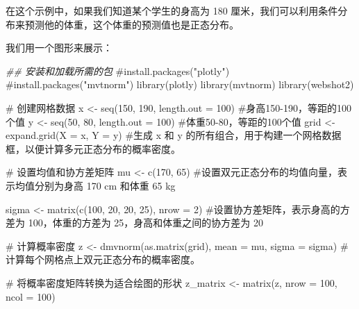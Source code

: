 \documentclass[
  letterpaper,
  DIV=11,
  numbers=noendperiod]{scrartcl}
\newenvironment{Shaded}{\begin{snugshade}}{\end{snugshade}}
\newcommand{\AttributeTok}[1]{\textcolor[rgb]{0.40,0.45,0.13}{#1}}
\newcommand{\CommentTok}[1]{\textcolor[rgb]{0.37,0.37,0.37}{#1}}
\newcommand{\DecValTok}[1]{\textcolor[rgb]{0.68,0.00,0.00}{#1}}
\newcommand{\DocumentationTok}[1]{\textcolor[rgb]{0.37,0.37,0.37}{\textit{#1}}}
\newcommand{\FunctionTok}[1]{\textcolor[rgb]{0.28,0.35,0.67}{#1}}
\newcommand{\NormalTok}[1]{\textcolor[rgb]{0.00,0.23,0.31}{#1}}
\newcommand{\OtherTok}[1]{\textcolor[rgb]{0.00,0.23,0.31}{#1}}
\begin{document}
在这个示例中，如果我们知道某个学生的身高为 180
厘米，我们可以利用条件分布来预测他的体重，这个体重的预测值也是正态分布。

我们用一个图形来展示：

\begin{Shaded}
\begin{Highlighting}[]
\DocumentationTok{\#\# 安装和加载所需的包}
\CommentTok{\#install.packages("plotly")}
\CommentTok{\#install.packages("mvtnorm")}
\FunctionTok{library}\NormalTok{(plotly)}
\FunctionTok{library}\NormalTok{(mvtnorm)}
\FunctionTok{library}\NormalTok{(webshot2)}

\CommentTok{\# 创建网格数据}
\NormalTok{x }\OtherTok{\textless{}{-}} \FunctionTok{seq}\NormalTok{(}\DecValTok{150}\NormalTok{, }\DecValTok{190}\NormalTok{, }\AttributeTok{length.out =} \DecValTok{100}\NormalTok{)}
\CommentTok{\#身高150{-}190，等距的100个值}
\NormalTok{y }\OtherTok{\textless{}{-}} \FunctionTok{seq}\NormalTok{(}\DecValTok{50}\NormalTok{, }\DecValTok{80}\NormalTok{, }\AttributeTok{length.out =} \DecValTok{100}\NormalTok{)}
\CommentTok{\#体重50{-}80，等距的100个值}
\NormalTok{grid }\OtherTok{\textless{}{-}} \FunctionTok{expand.grid}\NormalTok{(}\AttributeTok{X =}\NormalTok{ x, }\AttributeTok{Y =}\NormalTok{ y)}
\CommentTok{\#生成 x 和 y 的所有组合，用于构建一个网格数据框，以便计算多元正态分布的概率密度。}

\CommentTok{\# 设置均值和协方差矩阵}
\NormalTok{mu }\OtherTok{\textless{}{-}} \FunctionTok{c}\NormalTok{(}\DecValTok{170}\NormalTok{, }\DecValTok{65}\NormalTok{)}
\CommentTok{\#设置双元正态分布的均值向量，表示均值分别为身高 170 cm 和体重 65 kg}

\NormalTok{sigma }\OtherTok{\textless{}{-}} \FunctionTok{matrix}\NormalTok{(}\FunctionTok{c}\NormalTok{(}\DecValTok{100}\NormalTok{, }\DecValTok{20}\NormalTok{, }\DecValTok{20}\NormalTok{, }\DecValTok{25}\NormalTok{), }\AttributeTok{nrow =} \DecValTok{2}\NormalTok{)}
\CommentTok{\#设置协方差矩阵，表示身高的方差为 100，体重的方差为 25，身高和体重之间的协方差为 20}

\CommentTok{\# 计算概率密度}
\NormalTok{z }\OtherTok{\textless{}{-}} \FunctionTok{dmvnorm}\NormalTok{(}\FunctionTok{as.matrix}\NormalTok{(grid), }\AttributeTok{mean =}\NormalTok{ mu, }\AttributeTok{sigma =}\NormalTok{ sigma)}
\CommentTok{\#计算每个网格点上双元正态分布的概率密度。}

\CommentTok{\# 将概率密度矩阵转换为适合绘图的形状}
\NormalTok{z\_matrix }\OtherTok{\textless{}{-}} \FunctionTok{matrix}\NormalTok{(z, }\AttributeTok{nrow =} \DecValTok{100}\NormalTok{, }\AttributeTok{ncol =} \DecValTok{100}\NormalTok{)}


\end{Highlighting}
\end{Shaded}
\end{document}
